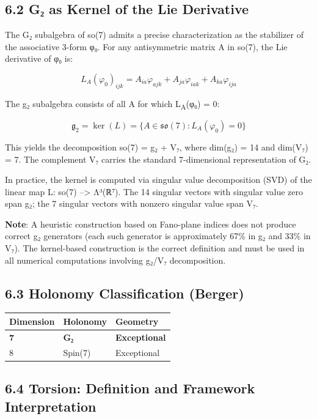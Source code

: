 \documentclass[11pt,a4paper]{article}
\begin{document}
\subsection{6.2 G₂ as Kernel of the Lie Derivative}\label{gux2082-as-kernel-of-the-lie-derivative}

The G₂ subalgebra of so(7) admits a precise characterization as the stabilizer of the associative 3-form φ₀. For any antisymmetric matrix A in so(7), the Lie derivative of φ₀ is:

\[L_A(\varphi_0)_{ijk} = A_{ia}\varphi_{ajk} + A_{ja}\varphi_{iak} + A_{ka}\varphi_{ija}\]

The g₂ subalgebra consists of all A for which L\textsubscript{A}(φ₀) = 0:

\[\mathfrak{g}_2 = \ker(L) = \{A \in \mathfrak{so}(7) : L_A(\varphi_0) = 0\}\]

This yields the decomposition so(7) = g₂ + V₇, where dim(g₂) = 14 and dim(V₇) = 7. The complement V₇ carries the standard 7-dimensional representation of G₂.

In practice, the kernel is computed via singular value decomposition (SVD) of the linear map L: so(7) --\textgreater{} Λ³(ℝ⁷). The 14 singular vectors with singular value zero span g₂; the 7 singular vectors with nonzero singular value span V₇.

\textbf{Note}: A heuristic construction based on Fano-plane indices does not produce correct g₂ generators (each such generator is approximately 67\% in g₂ and 33\% in V₇). The kernel-based construction is the correct definition and must be used in all numerical computations involving g₂/V₇ decomposition.

\subsection{6.3 Holonomy Classification (Berger)}\label{holonomy-classification-berger}

\begin{longtable}[]{@{}lll@{}}
\toprule\noalign{}
Dimension & Holonomy & Geometry \\
\midrule\noalign{}
\endhead
\bottomrule\noalign{}
\endlastfoot
\textbf{7} & \textbf{G₂} & \textbf{Exceptional} \\
8 & Spin(7) & Exceptional \\
\end{longtable}

\subsection{6.4 Torsion: Definition and Framework Interpretation}\label{torsion-definition-and-framework-interpretation}
\end{document}
